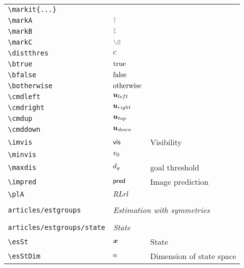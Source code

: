 \begin{longtable}{lll}
 {\color[rgb]{0.5,0.5,0.5}\texttt{\textbackslash markit\{...\}}} &  & \\ 
 {\color[rgb]{0.5,0.5,0.5}\texttt{\textbackslash markA}} & $\markA$ & \\ 
 {\color[rgb]{0.5,0.5,0.5}\texttt{\textbackslash markB}} & $\markB$ & \\ 
 {\color[rgb]{0.5,0.5,0.5}\texttt{\textbackslash markC}} & $\markC$ & \\ 
 {\color[rgb]{0.5,0.5,0.5}\texttt{\textbackslash distthres}} & $c$ & \\ 
 {\color[rgb]{0.5,0.5,0.5}\texttt{\textbackslash btrue}} & $\text{true}$ & \\ 
 {\color[rgb]{0.5,0.5,0.5}\texttt{\textbackslash bfalse}} & $\text{false}$ & \\ 
 {\color[rgb]{0.5,0.5,0.5}\texttt{\textbackslash botherwise}} & $\text{otherwise}$ & \\ 
 {\color[rgb]{0.5,0.5,0.5}\texttt{\textbackslash cmdleft}} & $\boldsymbol{u}_{left}$ & \\ 
 {\color[rgb]{0.5,0.5,0.5}\texttt{\textbackslash cmdright}} & $\boldsymbol{u}_{right}$ & \\ 
 {\color[rgb]{0.5,0.5,0.5}\texttt{\textbackslash cmdup}} & $\boldsymbol{u}_{top}$ & \\ 
 {\color[rgb]{0.5,0.5,0.5}\texttt{\textbackslash cmddown}} & $\boldsymbol{u}_{down}$ & \\ 
 {\color[rgb]{0.5,0.5,0.5}\texttt{\textbackslash imvis}} & $\mathsf{vis}$ &  Visibility\\ 
 {\color[rgb]{0.5,0.5,0.5}\texttt{\textbackslash minvis}} & $v_0$ & \\ 
 {\color[rgb]{0.5,0.5,0.5}\texttt{\textbackslash maxdis}} & $d_g$ &  goal threshold\\ 
 {\color[rgb]{0.5,0.5,0.5}\texttt{\textbackslash impred}} & $\mathsf{pred}$ &  Image prediction\\ 
 {\color[rgb]{0.5,0.5,0.5}\texttt{\textbackslash plA}} & $RLrl$ & \\ 
  &  & \\ 
 {\color[rgb]{0.5,0.5,0.5}\texttt{articles/estgroups}} & \multicolumn{2}{l}{\emph{Estimation with symmetries}}\\ 
 \hline
 &  & \\ 
 {\color[rgb]{0.5,0.5,0.5}\texttt{articles/estgroups/state}} & \multicolumn{2}{l}{\emph{State}}\\ 
 \hline
{\color[rgb]{0.5,0.5,0.5}\texttt{\textbackslash esSt}} & $\boldsymbol{x}$ &  State\\ 
 {\color[rgb]{0.5,0.5,0.5}\texttt{\textbackslash esStDim}} & $n$ &  Dimension of state space\\ 

\end{longtable}
